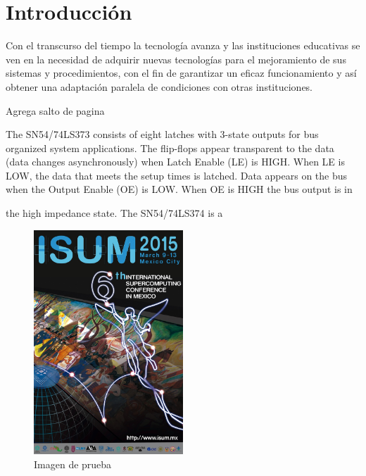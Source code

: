 \chapter[Introducción]{Introducción}

Con el transcurso del tiempo la tecnología avanza y las instituciones educativas se ven en la necesidad de adquirir nuevas tecnologías para el mejoramiento de sus sistemas y procedimientos, con el fin de garantizar un eficaz funcionamiento y así obtener una adaptación paralela de condiciones con otras instituciones.

\newpage
Agrega salto de pagina

\newpage
The SN54/74LS373 consists of eight latches with 3-state outputs for bus
organized system applications. The flip-flops appear transparent to the data
(data changes asynchronously) when Latch Enable (LE) is HIGH. When LE is \\
LOW, the data that meets the setup times is latched. Data appears on the bus \cite{web0}
when the Output Enable (OE) is LOW. When OE is HIGH the bus output is in\\ \par
the high impedance state.
The SN54/74LS374 is a 

\begin{figure}[!ht]
\begin{center}
  \includegraphics[width=0.5\textwidth]{secciones/isum15.jpg}
  \caption{Imagen de prueba}
\end{center}
\end{figure}



